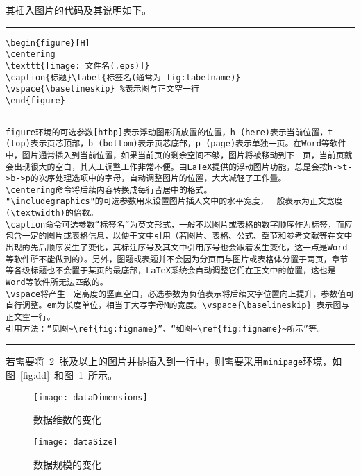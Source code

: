 其插入图片的代码及其说明如下。
\vspace{1em}\noindent\hrule
\begin{verbatim}
\begin{figure}[H]
\centering
\texttt{[image: 文件名(.eps)]}
\caption{标题}\label{标签名(通常为 fig:labelname)}
\vspace{\baselineskip} %表示图与正文空一行
\end{figure}
\end{verbatim}

\noindent\hrule

\begin{verbatim}
figure环境的可选参数[htbp]表示浮动图形所放置的位置，h (here)表示当前位置，t (top)表示页芯顶部，b (bottom)表示页芯底部，p (page)表示单独一页。在Word等软件中，图片通常插入到当前位置，如果当前页的剩余空间不够，图片将被移动到下一页，当前页就会出现很大的空白，其人工调整工作非常不便。由LaTeX提供的浮动图片功能，总是会按h->t->b->p的次序处理选项中的字母，自动调整图片的位置，大大减轻了工作量。
\centering命令将后续内容转换成每行皆居中的格式。
"\includegraphics"的可选参数用来设置图片插入文中的水平宽度，一般表示为正文宽度(\textwidth)的倍数。
\caption命令可选参数“标签名”为英文形式，一般不以图片或表格的数字顺序作为标签，而应包含一定的图片或表格信息，以便于文中引用（若图片、表格、公式、章节和参考文献等在文中出现的先后顺序发生了变化，其标注序号及其文中引用序号也会跟着发生变化，这一点是Word等软件所不能做到的）。另外，图题或表题并不会因为分页而与图片或表格体分置于两页，章节等各级标题也不会置于某页的最底部，LaTeX系统会自动调整它们在正文中的位置，这也是Word等软件所无法匹敌的。
\vspace将产生一定高度的竖直空白，必选参数为负值表示将后续文字位置向上提升，参数值可自行调整。em为长度单位，相当于大写字母M的宽度。\vspace{\baselineskip} 表示图与正文空一行。
引用方法：“见图~\ref{fig:figname}”、“如图~\ref{fig:figname}~所示”等。
\end{verbatim}

\noindent\hrule\vspace{1em}

若需要将~2~张及以上的图片并排插入到一行中，则需要采用\verb|minipage|环境，如图~\ref{fig:dd}~和图~\ref{fig:ds}~所示。
\begin{figure}[H]
\centering
\begin{minipage}{0.4\textwidth}
\centering
\texttt{[image: dataDimensions]}
\caption{数据维数的变化}\label{fig:dd}
\end{minipage}
\begin{minipage}{0.4\textwidth}
\centering
\texttt{[image: dataSize]}
\caption{数据规模的变化}\label{fig:ds}
\end{minipage}
\vspace{\baselineskip}
\end{figure}

